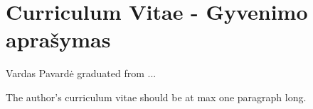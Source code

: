 
\chapter*{Curriculum Vitae - Gyvenimo aprašymas}
\label{cha:cv}


Vardas Pavardė graduated from ... 

The author's curriculum vitae should be at max one paragraph long.